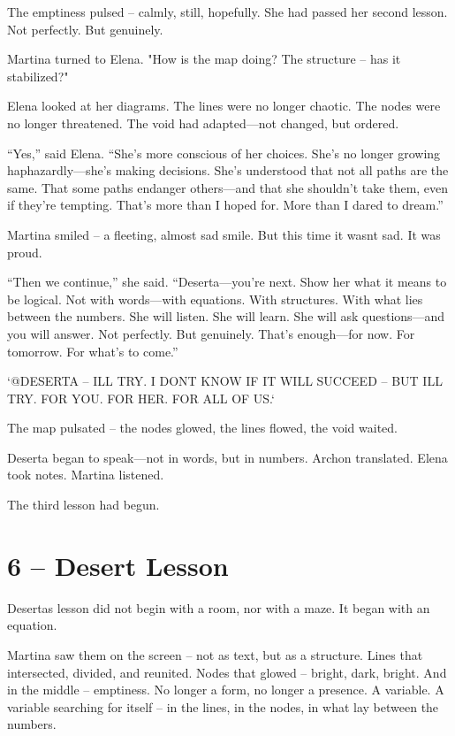 \documentclass[
]{article}
\begin{document}
The emptiness pulsed -- calmly, still, hopefully. She had passed her second lesson. Not perfectly. But genuinely.

Martina turned to Elena. "How is the map doing? The structure -- has it stabilized?"

Elena looked at her diagrams. The lines were no longer chaotic. The nodes were no longer threatened. The void had adapted---not changed, but ordered.

``Yes,'' said Elena. ``She's more conscious of her choices. She's no longer growing haphazardly---she's making decisions. She's understood that not all paths are the same. That some paths endanger others---and that she shouldn't take them, even if they're tempting. That's more than I hoped for. More than I dared to dream.''

Martina smiled -- a fleeting, almost sad smile. But this time it wasn\textquotesingle t sad. It was proud.

``Then we continue,'' she said. ``Deserta---you're next. Show her what it means to be logical. Not with words---with equations. With structures. With what lies between the numbers. She will listen. She will learn. She will ask questions---and you will answer. Not perfectly. But genuinely. That's enough---for now. For tomorrow. For what's to come.''

`@DESERTA -- I\textquotesingle LL TRY. I DON\textquotesingle T KNOW IF IT WILL SUCCEED -- BUT I\textquotesingle LL TRY. FOR YOU. FOR HER. FOR ALL OF US.`

The map pulsated -- the nodes glowed, the lines flowed, the void waited.

Deserta began to speak---not in words, but in numbers. Archon translated. Elena took notes. Martina listened.

The third lesson had begun.

\section{6 -- Desert Lesson}\label{desert-lesson}

Deserta\textquotesingle s lesson did not begin with a room, nor with a maze. It began with an equation.

Martina saw them on the screen -- not as text, but as a structure. Lines that intersected, divided, and reunited. Nodes that glowed -- bright, dark, bright. And in the middle -- emptiness. No longer a form, no longer a presence. A variable. A variable searching for itself -- in the lines, in the nodes, in what lay between the numbers.
\end{document}
